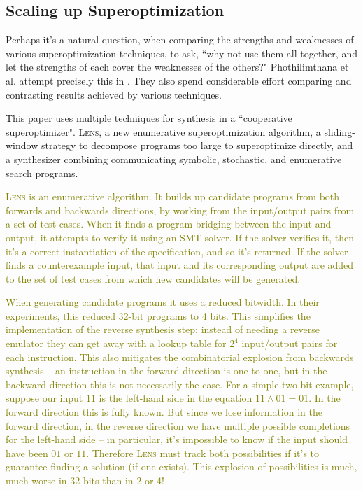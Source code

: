 \documentclass[12pt,twoside]{reedthesis}
\newcommand{\green}[1]{\textcolor{olive}{#1}}
\begin{document}

    \subsection{Scaling up Superoptimization}
        Perhaps it's a natural question, when comparing the strengths and weaknesses of various superoptimization techniques, to ask, ``why not use them all together, and let the strengths of each cover the weaknesses of the others?"
        Phothilimthana et al. attempt precisely this in \cite{phothilimthana2016scaling}.
        They also spend considerable effort comparing and contrasting results achieved by various techniques.
        
        This paper uses multiple techniques for synthesis in a ``cooperative superoptimizer".
        \textsc{Lens}, a new enumerative superoptimization algorithm,
        a sliding-window strategy to decompose programs too large to superoptimize directly,
        and a synthesizer combining communicating symbolic, stochastic, and enumerative search programs.
        
        \green{
        \textsc{Lens} is an enumerative algorithm.
        It builds up candidate programs from both forwards and backwards directions, by working from the input/output pairs from a set of test cases.
        When it finds a program bridging between the input and output, it attempts to verify it using an SMT solver.
            If the solver verifies it, then it's a correct instantiation of the specification, and so it's returned.
            If the solver finds a counterexample input, that input and its corresponding output are added to the set of test cases from which new candidates will be generated.
        }

        \green{
        When generating candidate programs it uses a reduced bitwidth.
        In their experiments, this reduced 32-bit programs to 4 bits.
        This simplifies the implementation of the reverse synthesis step; instead of needing a reverse emulator they can get away with a lookup table for $2^4$ input/output pairs for each instruction.
        This also mitigates the combinatorial explosion from backwards synthesis -- an instruction in the forward direction is one-to-one, but in the backward direction this is not necessarily the case. 
        For a simple two-bit example, suppose our input $11$ is the left-hand side in the equation $11 \wedge 01 = 01$.
        In the forward direction this is fully known.
        But since we lose information in the forward direction, in the reverse direction we have multiple possible completions for the left-hand side -- in particular, it's impossible to know if the input should have been $01$ or $11$.
        Therefore \textsc{Lens} must track both possibilities if it's to guarantee finding a solution (if one exists).
        This explosion of possibilities is much, much worse in 32 bits than in 2 or 4!
        }
\end{document}
